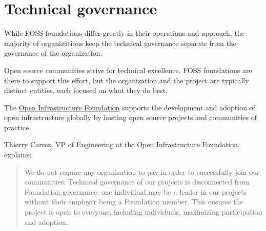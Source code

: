 


\chapter{Technical governance}

While FOSS foundations differ greatly in their operations and approach, the majority of organizations keep the technical governance separate from the governance of the organization.

Open source communities strive for technical excellence.  FOSS foundations are there to support this effort, but the organization and the project are typically distinct entities, each focused on what they do best.

\begin{kaobox}[frametitle=Technical governance at the Open Infrastructure Foundation]

The \href{https://openinfra.dev/}{Open Infrastructure Foundation} supports the development and adoption of open infrastructure globally by hosting open source projects and communities of practice.

Thierry Carrez, VP of Engineering at the Open Infrastructure Foundation, explains:

\begin{quote}

We do not require any organization to pay in order to successfully join our communities.  Technical governance of our projects is disconnected from Foundation governance: one individual may be a leader in our projects without their employer being a Foundation member.  This ensures the project is open to everyone, including individuals, maximizing participation and adoption.

\end{quote}

\end{kaobox}

